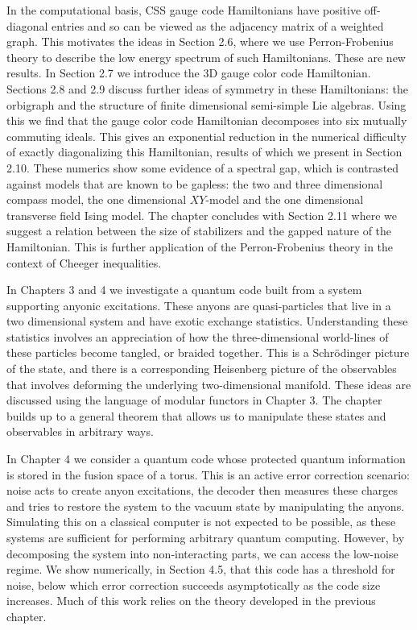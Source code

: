 \documentclass[11pt,oneside]{report}
\begin{document}
In the computational basis, 
CSS gauge code Hamiltonians have positive off-diagonal
entries and so can be viewed as the adjacency matrix
of a weighted graph.
This motivates the ideas in Section 2.6, where 
we use Perron-Frobenius theory to
describe the low energy spectrum of such Hamiltonians.
These are new results.
In Section 2.7 we introduce the 3D gauge color code Hamiltonian.
Sections 2.8 and 2.9 discuss further ideas of
symmetry in these Hamiltonians: the orbigraph and
the structure of finite dimensional semi-simple Lie algebras.
Using this we find that the gauge color code Hamiltonian
decomposes into six mutually commuting ideals.
This gives an exponential reduction in the numerical
difficulty of exactly diagonalizing this Hamiltonian,
results of which we present in Section 2.10.
These numerics show some evidence of a spectral
gap, which is contrasted against models that are known
to be gapless: the two and three dimensional compass model,
the one dimensional $XY$-model and the one dimensional
transverse field Ising model.
The chapter concludes with Section 2.11 where
we suggest a relation between the size of
stabilizers and the gapped nature of the Hamiltonian.
This is further application of the Perron-Frobenius 
theory in the context of Cheeger inequalities.

In Chapters 3 and 4 we investigate a quantum 
code built from a system supporting anyonic excitations.
These anyons are quasi-particles that live in a two
dimensional system and have exotic exchange statistics. 
Understanding these statistics involves an appreciation of
how the three-dimensional world-lines of these particles
become tangled, or braided together. This is 
a Schr\"{o}dinger picture of the state, and there is a corresponding
Heisenberg picture of the observables
that involves deforming the underlying
two-dimensional manifold.
These ideas are discussed using the language of modular functors
in Chapter 3.
The chapter builds up to 
a general theorem that allows us to manipulate these
states and observables in arbitrary ways.

In Chapter 4 we consider a quantum code whose protected
quantum information is stored in the fusion space of a torus.
This is an active error correction scenario: 
noise acts to create anyon excitations, the
decoder then measures these charges and tries to restore
the system to the vacuum state by manipulating the anyons.
Simulating this on a classical computer is not
expected to be possible, as these systems are sufficient for
performing arbitrary quantum computing.
However, by decomposing the system into non-interacting parts,
we can access the low-noise regime.
We show numerically, in Section 4.5,
that this code has a threshold for noise, 
below which error correction succeeds asymptotically
as the code size increases.
Much of this work relies on the theory developed in the
previous chapter.
\end{document}
